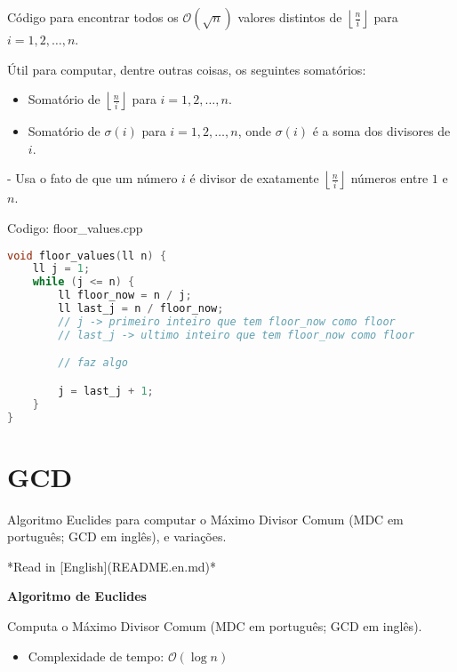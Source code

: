 \documentclass[10pt, a4paper, oneside]{book}
\begin{document}
Código para encontrar todos os $\mathcal{O}(\sqrt{n})$ valores distintos de $\left\lfloor \frac{n}{i} \right\rfloor$ para $i = 1, 2, \ldots, n$.



Útil para computar, dentre outras coisas, os seguintes somatórios:



\begin{itemize}
\item Somatório de $\left\lfloor \frac{n}{i} \right\rfloor$ para $i = 1, 2, \ldots, n$.
\end{itemize}



\begin{itemize}
\item Somatório de $\sigma(i)$ para $i = 1, 2, \ldots, n$, onde $\sigma(i)$ é a soma dos divisores de $i$.
\end{itemize}

    - Usa o fato de que um número $i$ é divisor de exatamente $\left\lfloor \frac{n}{i} \right\rfloor$ números entre $1$ e $n$.
\hfill

Codigo: floor\_values.cpp

\begin{lstlisting}[language=C++]
void floor_values(ll n) {
    ll j = 1;
    while (j <= n) {
        ll floor_now = n / j;
        ll last_j = n / floor_now;
        // j -> primeiro inteiro que tem floor_now como floor
        // last_j -> ultimo inteiro que tem floor_now como floor

        // faz algo

        j = last_j + 1;
    }
}
\end{lstlisting}
\hfill

\section{GCD}


Algoritmo Euclides para computar o Máximo Divisor Comum (MDC em português; GCD em inglês), e variações.



*Read in [English](README.en.md)*



\textbf{Algoritmo de Euclides} 



Computa o Máximo Divisor Comum (MDC em português; GCD em inglês).



\begin{itemize}
\item Complexidade de tempo: $\mathcal{O}(\log n)$
\end{itemize}
\end{document}
